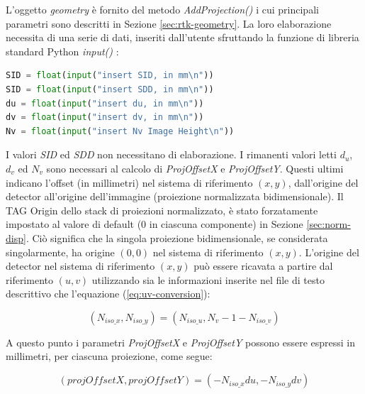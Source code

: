 \documentclass[a4paper,12pt, doubleside]{report}
\begin{document}
                L'oggetto \textit{geometry} è fornito del metodo \textit{AddProjection()} i cui principali parametri sono descritti in Sezione \ref{sec:rtk-geometry}. La loro elaborazione necessita di una serie di dati, inseriti dall'utente sfruttando la funzione di libreria standard Python \textit{input()} \cite{input-python}:
                    
                \begin{lstlisting}[language=python, frame=bt]
SID = float(input("insert SID, in mm\n"))
SID = float(input("insert SDD, in mm\n"))
du = float(input("insert du, in mm\n"))
dv = float(input("insert dv, in mm\n"))
Nv = float(input("insert Nv Image Height\n"))
                \end{lstlisting}
                    
                I valori \textit{SID} ed \textit{SDD} non necessitano di elaborazione. I rimanenti valori letti $d_u$, $d_v$ ed $N_v$ sono necessari al calcolo di \textit{ProjOffsetX} e \textit{ProjOffsetY}. Questi ultimi indicano l'offset (in millimetri) nel sistema di riferimento $(x,y)$, dall'origine del detector all'origine dell'immagine (proiezione normalizzata bidimensionale). Il TAG Origin dello stack di proiezioni normalizzato, è stato forzatamente impostato al valore di default ($0$ in ciascuna componente) in Sezione \ref{sec:norm-disp}. Ciò significa che la singola proiezione bidimensionale, se considerata singolarmente, ha origine $(0,0)$ nel sistema di riferimento $(x,y)$. L'origine del detector nel sistema di riferimento $(x,y)$ può essere ricavata a partire dal riferimento $(u,v)$ utilizzando sia le informazioni inserite nel file di testo descrittivo che l'equazione (\ref{eq:uv-conversion}):
                    
                \begin{equation}
                    (N_{iso\_x}, N_{iso\_y}) = (N_{iso\_u} , N_v - 1 - N_{iso\_v})
                \end{equation}
                    
                A questo punto i parametri \textit{ProjOffsetX} e \textit{ProjOffsetY} possono essere espressi in millimetri, per ciascuna proiezione, come segue:
                
                \begin{equation}
                    (projOffsetX, projOffsetY) = (- N_{iso\_x} du, - N_{iso\_y} dv)
                \end{equation}
                    
\end{document}
